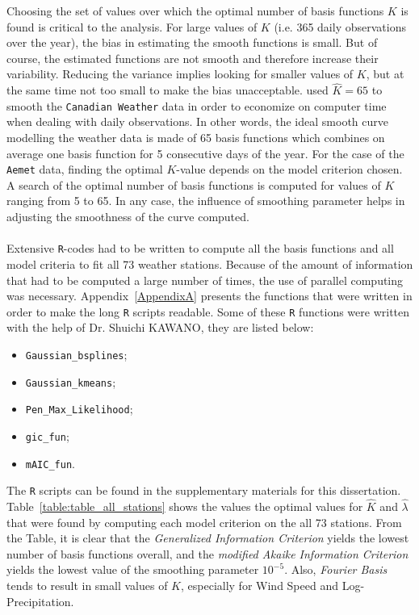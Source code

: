 Choosing the set of values over which the optimal number of basis functions $K$ is found is critical to the analysis. For large values of $K$ (i.e. 365 daily observations over the year), the bias in estimating the smooth functions is small. But of course, the estimated functions are not smooth and therefore increase their variability. Reducing the variance implies looking for smaller values of $K$, but at the same time not too small to make the bias unacceptable.  \cite{olberd:ramsay} used $\hat{K} = 65$ to smooth the \texttt{Canadian Weather} data in order to economize on computer time when dealing with daily observations.  In other words, the ideal smooth curve modelling the weather data is made of 65 basis functions which combines on average one basis function for 5 consecutive days of the year. For the case of the \texttt{Aemet} data, finding the optimal $K$-value depends on the model criterion chosen. A search of the optimal number of basis functions is computed for values of $K$ ranging from 5 to 65. In any case, the influence of smoothing parameter helps in adjusting the smoothness of the curve computed.
\\
\\
Extensive \texttt{R}-codes had to be written to compute all the basis functions and all model criteria to fit all 73 weather stations. Because of the amount of information that had to be computed a large number of times, the use of parallel computing was necessary. Appendix~\ref{AppendixA} presents the functions that were written in order to make the long \texttt{R} scripts readable. Some of these \texttt{R} functions were written with the help of \textrm{Dr. Shuichi KAWANO}, they are listed below:
\begin{itemize}
\item \texttt{Gaussian\_bsplines};
\item \texttt{Gaussian\_kmeans};
\item \texttt{Pen\_Max\_Likelihood};
\item \texttt{gic\_fun};
\item \texttt{mAIC\_fun}.
\end{itemize}
The \texttt{R} scripts can be found in the supplementary materials for this dissertation.
\clearpage
Table~\ref{table:table_all_stations} shows the values the optimal values for $\hat{K}$ and $\hat{\lambda}$ that were found by computing each model criterion on the all 73 stations. From the Table, it is clear that the \textit{Generalized Information Criterion} yields the lowest number of basis functions overall, and the \textit{modified Akaike Information Criterion} yields the lowest value of the smoothing parameter $10^{-5}$. Also, \textit{Fourier Basis} tends to result in small values of $K$, especially for Wind Speed and Log-Precipitation.

